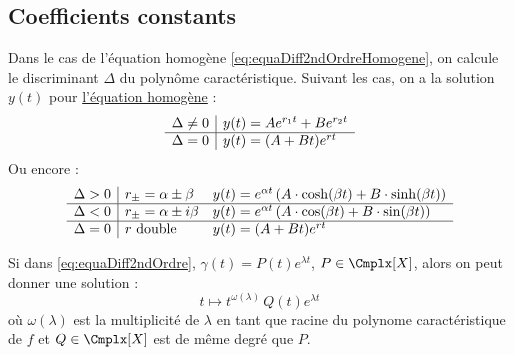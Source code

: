 \documentclass[11pt,a4paper,fleqn,pdftex]{report}
\begin{document}
\subsection{Coefficients constants}
\begin{itheorem}
Dans le cas de l'équation homogène \eqref{eq:equaDiff2ndOrdreHomogene}, on calcule le discriminant $\Delta$ du polynôme caractéristique. Suivant les cas, on a la solution $y(t)$ pour \uline{l'équation homogène} : 
\[
\begin{array}{r | l}
\Delta \neq 0 & y(t) = A e^{r_1t}+B e^{r_2t}\\
\hline
\Delta = 0 & y(t) = (A+Bt)e^{rt}
\end{array}
\]
Ou encore : 
\[
\begin{array}{r | l l}
\Delta > 0 & r_{\pm}=\alpha \pm \beta &y(t) = e^{\alpha t}\left( A\cdot \cosh(\beta t) + B\cdot \sinh (\beta t) \right)
\\
\hline
\Delta < 0 & r_{\pm}=\alpha \pm i\beta &y(t) = e^{\alpha t}\left( A\cdot \cos(\beta t) + B\cdot \sin (\beta t) \right)
\\
\hline
\Delta = 0 & r \text{ double}& y(t) = (A+Bt)e^{rt}
\end{array}
\]
\end{itheorem}
\begin{theorem}
    Si dans \eqref{eq:equaDiff2ndOrdre}, $\gamma (t)= P(t)e^{\lambda t}$, $P\in \Cmplx [X]$, alors on peut donner une solution :
    \begin{equation}
    t \mapsto t^{\omega(\lambda)}\, Q(t)e^{\lambda t}
    \end{equation}
    où $\omega(\lambda )$ est la multiplicité de $\lambda$ en tant que racine du polynome caractéristique de $f$ et $Q \in \Cmplx[X]$ est de même degré que $P$.
\end{theorem}
\end{document}
